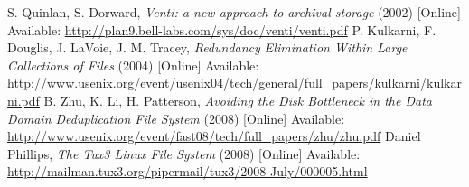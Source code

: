 \documentclass[final]{ols}
\begin{document}
\begin{thebibliography}{99}
\raggedright
{} S. Quinlan, S. Dorward, 
\textit{Venti: a new approach to archival storage} (2002) [Online] Available:
\url{http://plan9.bell-labs.com/sys/doc/venti/venti.pdf}
 P. Kulkarni, F. Douglis, J. LaVoie, J. M. Tracey,
\textit{Redundancy Elimination Within Large Collections of Files} (2004) [Online] Available:
\url{http://www.usenix.org/event/usenix04/tech/general/full_papers/kulkarni/kulkarni.pdf}
 B. Zhu, K. Li, H. Patterson,
\textit{Avoiding the Disk Bottleneck in the Data Domain Deduplication File System} (2008) [Online] Available:
\url{http://www.usenix.org/event/fast08/tech/full_papers/zhu/zhu.pdf}
 Daniel Phillips,
\textit{The Tux3 Linux File System} (2008) [Online] Available:
\url{http://mailman.tux3.org/pipermail/tux3/2008-July/000005.html}
\end{thebibliography}
\end{document}
